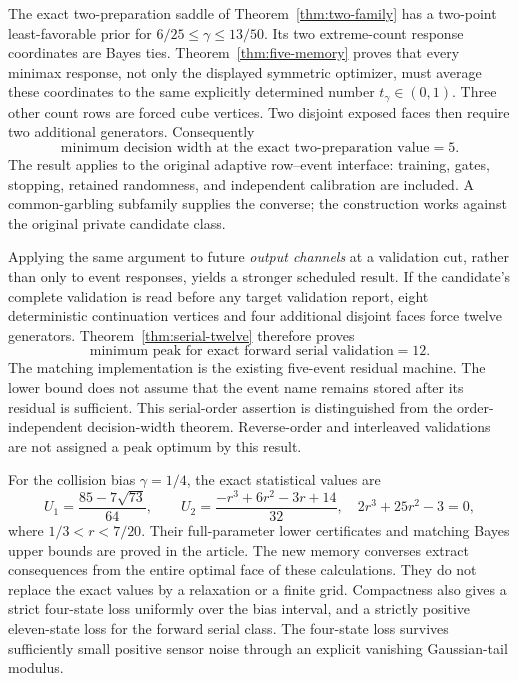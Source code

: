 \documentclass[11pt]{amsart}
\theoremstyle{definition}\newtheorem{definition}[theorem]{Definition}
\theoremstyle{remark}\newtheorem{remark}[theorem]{Remark}
\newcommand{\1}{\mathbf 1}
\begin{document}
The exact two-preparation saddle of Theorem~\ref{thm:two-family} has a
two-point least-favorable prior for $6/25\le\gamma\le13/50$.
Its two extreme-count response coordinates are Bayes ties.
Theorem~\ref{thm:five-memory} proves that every minimax response, not
only the displayed symmetric optimizer, must average these coordinates
to the same explicitly determined number $t_\gamma\in(0,1)$.
Three other count rows are forced cube vertices. Two disjoint exposed
faces then require two additional generators. Consequently
\[
 \boxed{\text{minimum decision width at the exact two-preparation value}=5.}
\]
The result applies to the original adaptive row--event interface:
training, gates, stopping, retained randomness, and independent calibration
are included. A common-garbling subfamily supplies the converse; the
construction works against the original private candidate class.

Applying the same argument to future \emph{output channels} at a
validation cut, rather than only to event responses, yields a stronger
scheduled result. If the candidate's complete validation is read before
any target validation report, eight deterministic continuation vertices
and four additional disjoint faces force twelve generators. Theorem~\ref{thm:serial-twelve}
therefore proves
\[
 \boxed{\text{minimum peak for exact forward serial validation}=12.}
\]
The matching implementation is the existing five-event residual machine.
The lower bound does not assume that the event name remains stored after
its residual is sufficient. This serial-order assertion is distinguished
from the order-independent decision-width theorem. Reverse-order and
interleaved validations are not assigned a peak optimum by this result.

For the collision bias $\gamma=1/4$, the exact statistical values are
\begin{equation}\label{eq:intro-exact-values}
 U_1=\frac{85-7\sqrt{73}}{64},\qquad
 U_2=\frac{-r^3+6r^2-3r+14}{32},\quad 2r^3+25r^2-3=0,
\end{equation}
where $1/3<r<7/20$. Their full-parameter lower certificates and matching
Bayes upper bounds are proved in the article. The new memory converses
extract consequences from the entire optimal face of these calculations.
They do not replace the exact values by a relaxation or a finite grid.
Compactness also gives a strict four-state loss uniformly over the
bias interval, and a strictly positive eleven-state loss for the forward
serial class. The four-state loss survives sufficiently small positive
sensor noise through an explicit vanishing Gaussian-tail modulus.
\end{document}
